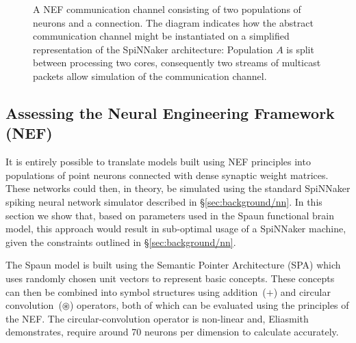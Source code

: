 \documentclass[conference]{IEEEtran}
\begin{document}
  \begin{figure}
    \centering
    
    \caption{A NEF communication channel consisting of two populations of neurons and a connection.
    The diagram indicates how the abstract communication channel might be instantiated on a simplified representation of the SpiNNaker architecture:
    Population $A$ is split between processing two cores, consequently two streams of multicast packets allow simulation of the communication channel.
    }
    \label{fig:background/comms-channel}
  \end{figure}
  
  \subsection{Assessing the Neural Engineering Framework (NEF)}
  \label{sec:background/assessing}

It is entirely possible to translate models built using NEF principles into populations of point neurons connected with dense synaptic weight matrices.
These networks could then, in theory, be simulated using the standard SpiNNaker spiking neural network simulator described in \S\ref{sec:background/nn}.
In this section we show that, based on parameters used in the Spaun functional brain model, this approach would result in sub-optimal usage of a SpiNNaker machine, given the constraints outlined in \S\ref{sec:background/nn}.

The Spaun model is built using the Semantic Pointer Architecture (SPA) \parencite{eliasmith2013build} which uses randomly chosen unit vectors to represent basic concepts.
These concepts can then be combined into symbol structures using addition~($+$) and circular convolution~($\circledast$) operators, both of which can be evaluated using the principles of the NEF.
The circular-convolution operator is non-linear and, Eliasmith \parencite{eliasmith2013build} demonstrates, require around 70 neurons per dimension to calculate accurately.
\end{document}
